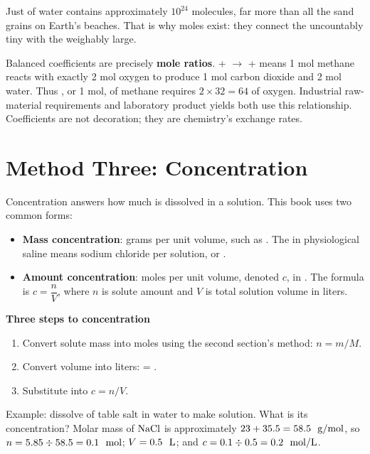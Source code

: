 Just  of water contains approximately $10^{24}$ molecules, far more than all the sand grains on Earth's beaches. That is why moles exist: they connect the uncountably tiny with the weighably large.

\begin{qiaoliang}
Balanced coefficients are precisely \textbf{mole ratios}.  +  $\rightarrow$  +  means 1 mol methane reacts with exactly 2 mol oxygen to produce 1 mol carbon dioxide and 2 mol water. Thus , or 1 mol, of methane requires $2\times32=64$  of oxygen. Industrial raw-material requirements and laboratory product yields both use this relationship. Coefficients are not decoration; they are chemistry's exchange rates.
\end{qiaoliang}

\section{Method Three: Concentration}

Concentration answers how much is dissolved in a solution. This book uses two common forms:

\begin{itemize}[itemsep=2pt]
\item \textbf{Mass concentration}: grams per unit volume, such as . The  in physiological saline means  sodium chloride per  solution, or .
\item \textbf{Amount concentration}: moles per unit volume, denoted $c$, in . The formula is $c = \dfrac{n}{V}$, where $n$ is solute amount and $V$ is total solution volume in liters.
\end{itemize}

\textbf{Three steps to concentration}

\begin{enumerate}[itemsep=2pt]
\item Convert solute mass into moles using the second section's method: $n = m/M$.
\item Convert volume into liters:  = .
\item Substitute into $c = n/V$.
\end{enumerate}

Example: dissolve  of table salt in water to make  solution. What is its concentration? Molar mass of $\mathrm{NaCl}$ is approximately $23+35.5=58.5\ \ \mathrm{g/mol}$, so $n=5.85\div58.5=0.1\ \ \mathrm{mol}$; $V=0.5\ \ \mathrm{L}$; and $c=0.1\div0.5=0.2\ \ \mathrm{mol/L}$.

